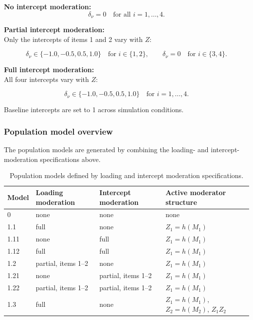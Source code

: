 \documentclass[
  man,
  floatsintext]{apa7}
\begin{document}
\textbf{No intercept moderation:}\\
\[
\delta_{\nu}=0 \quad \text{for all } i=1,\dots,4.
\]

\textbf{Partial intercept moderation:}\\
Only the intercepts of items 1 and 2 vary with \(Z\):

\[
\delta_{\nu} \in \{-1.0,-0.5,0.5,1.0\}
\quad \text{for } i \in \{1,2\},
\qquad
\delta_{\nu}=0
\quad \text{for } i \in \{3,4\}.
\]

\textbf{Full intercept moderation:}\\
All four intercepts vary with \(Z\):

\[
\delta_{\nu} \in \{-1.0,-0.5,0.5,1.0\}
\quad \text{for } i=1,\dots,4.
\]

Baseline intercepts are set to 1 across simulation conditions.

\newpage

\subsubsection{Population model
overview}\label{population-model-overview}

The population models are generated by combining the loading- and
intercept-moderation specifications above.

\begin{table}[!htbp]
\centering
\caption{Population models defined by loading and intercept moderation specifications.}
\label{tab:population-models}
\begin{tabular}{llll}
\toprule
Model & Loading moderation & Intercept moderation & Active moderator structure \\
\midrule
0 & none & none & none \\
1.1 & full & none & $Z_1 = h(M_1)$ \\
1.11 & none & full & $Z_1 = h(M_1)$ \\
1.12 & full & full & $Z_1 = h(M_1)$ \\
1.2 & partial, items 1--2 & none & $Z_1 = h(M_1)$ \\
1.21 & none & partial, items 1--2 & $Z_1 = h(M_1)$ \\
1.22 & partial, items 1--2 & partial, items 1--2 & $Z_1 = h(M_1)$ \\
1.3 & full & none & $Z_1 = h(M_1)$, $Z_2 = h(M_2)$, $Z_1 Z_2$ \\
\bottomrule
\end{tabular}
\end{table}
\end{document}
